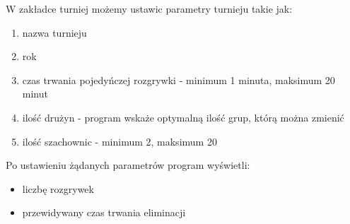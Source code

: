 W zakładce turniej możemy ustawic parametry turnieju takie jak:
\begin{enumerate}
	\item nazwa turnieju
	\item rok
	\item czas trwania pojedyńczej rozgrywki - minimum 1 minuta, maksimum 20 minut
	\item ilość drużyn - program wskaże optymalną ilość grup, którą można zmienić
	\item ilość szachownic - minimum 2, maksimum 20 
\end{enumerate}
Po ustawieniu żądanych parametrów program wyświetli:
\begin{itemize}
	\item liczbę rozgrywek
	\item przewidywany czas trwania eliminacji
\end{itemize}



